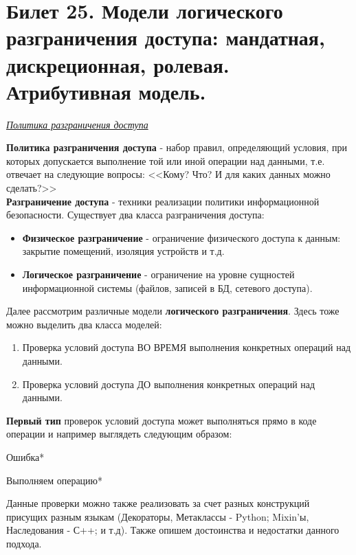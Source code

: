 \newpage
\section {Билет 25. Модели логического разграничения доступа: мандатная, дискреционная, ролевая. Атрибутивная модель.}

\begin{center}
	\textit{\underline{Политика разграничения доступа}}
\end{center}

\textbf{Политика разграничения доступа} - набор правил, определяющий условия, при которых допускается выполнение той или иной операции над данными, т.е. отвечает на следующие вопросы: <<Кому? Что? И для каких данных можно сделать?>>\\

\textbf{Разграничение доступа} - техники реализации политики информационной безопасности. Существует два класса разграничения доступа:
\begin{itemize}
 \item \textbf{Физическое разграничение} - ограничение физического доступа к данным: закрытие помещений, изоляция устройств и т.д.
 \item \textbf{Логическое разграничение} - ограничение на уровне сущностей информационной системы (файлов, записей в БД, сетевого доступа).
\end{itemize}

Далее рассмотрим различные модели \textbf{логического разграничения}. Здесь тоже можно выделить два класса моделей:
\begin{enumerate}
	\item Проверка условий доступа ВО ВРЕМЯ выполнения конкретных операций над данными. 
	\item Проверка условий доступа ДО выполнения конкретных операций над данными.
\end{enumerate}

\textbf{Первый тип} проверок условий доступа может выполняться прямо в коде операции и например выглядеть следующим образом:
\begin{algorithm}
\begin{algorithmic}[H!]
	\State *Ошибка*
	\EndIf
	
	\State *Выполняем операцию*
\end{algorithmic}
\end{algorithm}


Данные проверки можно также реализовать за счет разных конструкций присущих разным языкам (Декораторы, Метаклассы - Python; Mixin'ы, Наследования - С++; и т.д). Также опишем достоинства и недостатки данного подхода.

